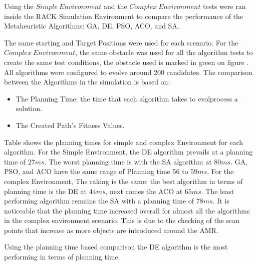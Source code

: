 Using the \(Simple~Environment\) and the \(Complex~Environment\) tests were ran inside the 
RACK Simulation Environment to compare the performance of the Metaheuristic Algorithms: GA, DE, PSO,
ACO, and SA. 

The same starting and Target Positions were used for each scenario. For the \(Complex~Environment\),
the same obstacle was used for all the algorithm tests to create the same test conditions, the obstacle used is 
marked in green on figure . All algorithms were configured to evolve around 200 candidates.
The comparison between the Algorithms in the simulation is based on: 
\begin{itemize}
    \item The Planning Time: the time that each algorithm takes to evolprocess a solution.
    \item The Created Path's Fitness Values.
\end{itemize}

Table  shows the planning times for simple and complex Environment 
for each algorithm. 
For the Simple Environment, the DE algorithm prevails at a planning time of \(27ms\).
The worst planning time is with the SA algorithm at \(80ms\). 
GA, PSO, and ACO have the same range of Planning time \(56\) to \(59ms\).
For the complex Environment, The raking is the same: the best algorithm in terms of planning time 
is the DE at \(44ms\), next comes the ACO at \(65ms\). The least performing algorithm remains the SA 
with a planning time of \(78ms\). It is noticeable that the planning time increased overall
for almost all the algorithms in the complex environment scenario. 
This is due to the checking of the scan points that increase as more objects are introduced around the AMR.

Using the planning time based comparison the DE algorithm is the most performing in terms of planning time. 

